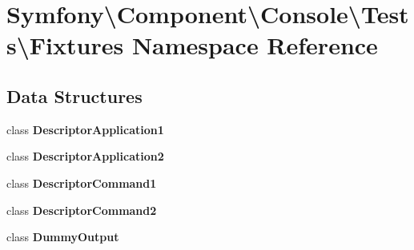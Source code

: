 \section{Symfony\textbackslash{}Component\textbackslash{}Console\textbackslash{}Tests\textbackslash{}Fixtures Namespace Reference}
\label{namespace_symfony_1_1_component_1_1_console_1_1_tests_1_1_fixtures}
\subsection*{Data Structures}
\begin{DoxyCompactItemize}
\item 
class {\bf Descriptor\+Application1}
\item 
class {\bf Descriptor\+Application2}
\item 
class {\bf Descriptor\+Command1}
\item 
class {\bf Descriptor\+Command2}
\item 
class {\bf Dummy\+Output}
\end{DoxyCompactItemize}
